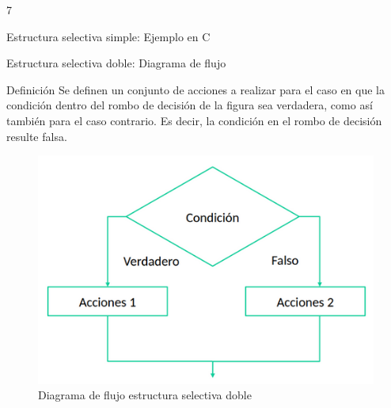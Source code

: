 7\documentclass[xcolor=pdftex,table,11pt]{beamer}
\begin{document}
\begin{frame}{Estructura selectiva simple: Ejemplo en C}
\codesetstylefrombeamer
{}
\end{frame}



\begin{frame}{Estructura selectiva doble: Diagrama de flujo}
\begin{block}{Definición}
Se definen un conjunto de acciones a realizar para el caso en que la condición dentro del rombo de decisión de la figura sea verdadera, como así también para el caso contrario. Es decir, la condición en el rombo de decisión resulte falsa.
\end{block}


 \begin{figure}
 \centering
\includegraphics[scale=0.3]{../img/exported/if_else.png}
\caption{Diagrama de flujo estructura selectiva doble}
\end{figure}

\end{frame}
\end{document}
